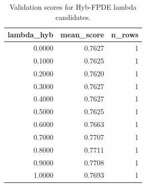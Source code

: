 \begin{table}[t]
\caption{Validation scores for Hyb-FPDE lambda candidates.}
\label{tab:lambda_distribution_computed}
\centering
\begin{tabular}{rrr}
\toprule
lambda\_hyb & mean\_score & n\_rows \\
\midrule
0.0000 & 0.7627 & 1 \\
0.1000 & 0.7625 & 1 \\
0.2000 & 0.7620 & 1 \\
0.3000 & 0.7627 & 1 \\
0.4000 & 0.7627 & 1 \\
0.5000 & 0.7625 & 1 \\
0.6000 & 0.7663 & 1 \\
0.7000 & 0.7707 & 1 \\
0.8000 & 0.7711 & 1 \\
0.9000 & 0.7708 & 1 \\
1.0000 & 0.7693 & 1 \\
\bottomrule
\end{tabular}

\end{table}
